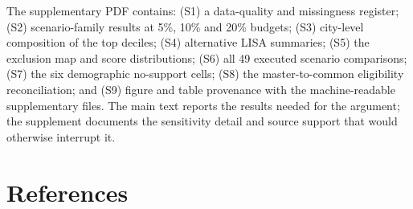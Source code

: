 \documentclass[times,twoside]{_Templates/MultiTargetManuscript}
\begin{document}
The supplementary PDF contains: (S1) a data-quality and missingness register;
(S2) scenario-family results at 5\%, 10\% and 20\% budgets; (S3) city-level
composition of the top deciles; (S4) alternative LISA summaries; (S5) the
exclusion map and score distributions; (S6) all 49 executed scenario
comparisons; (S7) the six demographic no-support cells; (S8) the
master-to-common eligibility reconciliation; and (S9) figure and table
provenance with the machine-readable supplementary files. The main text reports
the results needed for the argument; the supplement documents the sensitivity
detail and source support that would otherwise interrupt it.

\clearpage
\section*{References}
\begingroup
\setlength{\emergencystretch}{5em}
\sloppy

\endgroup
\end{document}
